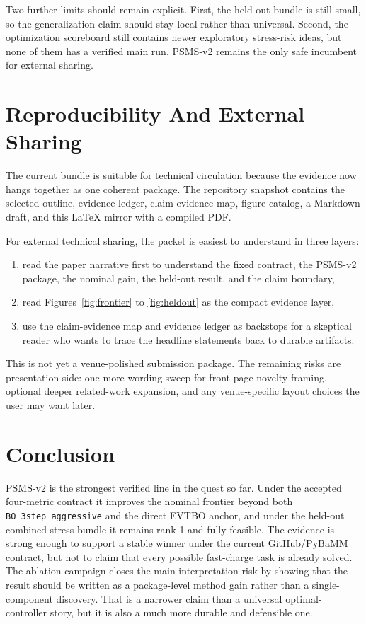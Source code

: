 \documentclass[11pt]{article}
\begin{document}
Two further limits should remain explicit. First, the held-out bundle is still small, so the generalization claim should stay local rather than universal. Second, the optimization scoreboard still contains newer exploratory stress-risk ideas, but none of them has a verified main run. PSMS-v2 remains the only safe incumbent for external sharing.

\section{Reproducibility And External Sharing}

The current bundle is suitable for technical circulation because the evidence now hangs together as one coherent package. The repository snapshot contains the selected outline, evidence ledger, claim-evidence map, figure catalog, a Markdown draft, and this LaTeX mirror with a compiled PDF.

For external technical sharing, the packet is easiest to understand in three layers:
\begin{enumerate}
  \item read the paper narrative first to understand the fixed contract, the PSMS-v2 package, the nominal gain, the held-out result, and the claim boundary,
  \item read Figures~\ref{fig:frontier} to \ref{fig:heldout} as the compact evidence layer,
  \item use the claim-evidence map and evidence ledger as backstops for a skeptical reader who wants to trace the headline statements back to durable artifacts.
\end{enumerate}

This is not yet a venue-polished submission package. The remaining risks are presentation-side: one more wording sweep for front-page novelty framing, optional deeper related-work expansion, and any venue-specific layout choices the user may want later.

\section{Conclusion}

PSMS-v2 is the strongest verified line in the quest so far. Under the accepted four-metric contract it improves the nominal frontier beyond both \texttt{BO\_3step\_aggressive} and the direct EVTBO anchor, and under the held-out combined-stress bundle it remains rank-1 and fully feasible. The evidence is strong enough to support a stable winner under the current GitHub/PyBaMM contract, but not to claim that every possible fast-charge task is already solved. The ablation campaign closes the main interpretation risk by showing that the result should be written as a package-level method gain rather than a single-component discovery. That is a narrower claim than a universal optimal-controller story, but it is also a much more durable and defensible one.



\end{document}
